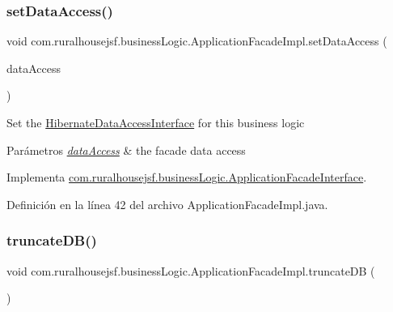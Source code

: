 \subsubsection{\texorpdfstring{setDataAccess()}{setDataAccess()}}
{\footnotesize\ttfamily void com.\+ruralhousejsf.\+business\+Logic.\+Application\+Facade\+Impl.\+set\+Data\+Access (\begin{DoxyParamCaption}\item[{\mbox{\hyperlink{interfacecom_1_1ruralhousejsf_1_1data_access_1_1_hibernate_data_access_interface}{Hibernate\+Data\+Access\+Interface}}}]{data\+Access }\end{DoxyParamCaption})}

Set the \mbox{\hyperlink{}{Hibernate\+Data\+Access\+Interface}} for this business logic


\begin{DoxyParams}{Parámetros}
{\em \mbox{\hyperlink{namespacecom_1_1ruralhousejsf_1_1data_access}{data\+Access}}} & the facade data access \\
\hline
\end{DoxyParams}


Implementa \mbox{\hyperlink{interfacecom_1_1ruralhousejsf_1_1business_logic_1_1_application_facade_interface_a8bb95aa007a4d95b32ed838ae40406c0}{com.\+ruralhousejsf.\+business\+Logic.\+Application\+Facade\+Interface}}.



Definición en la línea 42 del archivo Application\+Facade\+Impl.\+java.

\mbox{\label{classcom_1_1ruralhousejsf_1_1business_logic_1_1_application_facade_impl_a5fe9f44c95b3459fb8999c26e5b934cb}} 
\subsubsection{\texorpdfstring{truncateDB()}{truncateDB()}}
{\footnotesize\ttfamily void com.\+ruralhousejsf.\+business\+Logic.\+Application\+Facade\+Impl.\+truncate\+DB (\begin{DoxyParamCaption}{ }\end{DoxyParamCaption})}

